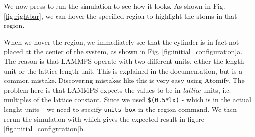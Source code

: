\documentclass[aps,pre,twocolumn,letterpaper,floatfix,nofootinbib]{revtex4}
\newcommand{\code}[1]{\colorbox{light-gray}{\color{RawSienna}\texttt{#1}}}
\begin{document}
We now press  to run the simulation to see how it looks.
As shown in Fig. \ref{fig:rightbar}, we can hover the specified region to highlight the atoms in that region.

When we hover the region, we immediately see that the cylinder is in fact not placed at the center of the system, as shown in Fig. \ref{fig:initial_configuration}a.
The reason is that LAMMPS operate with two different units, either the length unit or the lattice length unit. This is explained in the documentation, but is a common mistake.
Discovering mistakes like this is very easy using Atomify.
The problem here is that LAMMPS expects the values to be in \textit{lattice} units, i.e. multiples of the lattice constant.
Since we used \code{\$(0.5*lx)} - which is in the actual lenght units - we need to specify \code{units box} in the region command.
We then rerun the simulation with  which gives the expected result in figure \ref{fig:initial_configuration}b.
\end{document}
